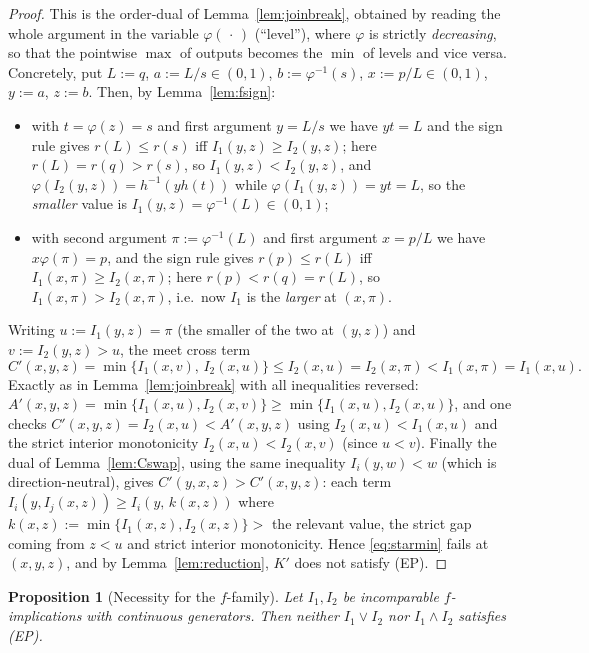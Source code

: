 \documentclass{amsart}
\theoremstyle{plain}
\newtheorem{proposition}{Proposition}
\theoremstyle{definition}
\begin{document}
\begin{proof}
This is the order-dual of Lemma~\ref{lem:joinbreak}, obtained by reading the whole argument
in the variable $\varphi(\,\cdot\,)$ (``level''), where $\varphi$ is strictly
\emph{decreasing}, so that the pointwise $\max$ of outputs becomes the $\min$ of levels and
vice versa.  Concretely, put $L:=q$, $a:=L/s\in(0,1)$, $b:=\varphi^{-1}(s)$, $x:=p/L\in
(0,1)$, $y:=a$, $z:=b$.  Then, by Lemma~\ref{lem:fsign}:
\begin{itemize}
\item with $t=\varphi(z)=s$ and first argument $y=L/s$ we have $yt=L$ and the sign rule
gives $r(L)\le r(s)$ iff $I_1(y,z)\ge I_2(y,z)$; here $r(L)=r(q)>r(s)$, so
$I_1(y,z)<I_2(y,z)$, and $\varphi(I_2(y,z))=h^{-1}(y h(t))$ while
$\varphi(I_1(y,z))=yt=L$, so the \emph{smaller} value is $I_1(y,z)=\varphi^{-1}(L)\in(0,1)$;
\item with second argument $\pi:=\varphi^{-1}(L)$ and first argument $x=p/L$ we have
$x\varphi(\pi)=p$, and the sign rule gives $r(p)\le r(L)$ iff $I_1(x,\pi)\ge I_2(x,\pi)$;
here $r(p)<r(q)=r(L)$, so $I_1(x,\pi)>I_2(x,\pi)$, i.e.\ now $I_1$ is the \emph{larger} at
$(x,\pi)$.
\end{itemize}
Writing $u:=I_1(y,z)=\pi$ (the smaller of the two at $(y,z)$) and $v:=I_2(y,z)>u$, the meet
cross term
\[
C'(x,y,z)=\min\{I_1(x,v),\,I_2(x,u)\}\le I_2(x,u)=I_2(x,\pi)<I_1(x,\pi)=I_1(x,u).
\]
Exactly as in Lemma~\ref{lem:joinbreak} with all inequalities reversed:
$A'(x,y,z)=\min\{I_1(x,u),I_2(x,v)\}\ge\min\{I_1(x,u),I_2(x,u)\}$, and one checks
$C'(x,y,z)=I_2(x,u)<A'(x,y,z)$ using $I_2(x,u)<I_1(x,u)$ and the strict interior
monotonicity $I_2(x,u)<I_2(x,v)$ (since $u<v$).  Finally the dual of
Lemma~\ref{lem:Cswap}, using the same inequality $I_i(y,w)<w$ (which is direction-neutral),
gives $C'(y,x,z)>C'(x,y,z)$: each term $I_i(y,I_j(x,z))\ge I_i(y,\,k(x,z))$ where
$k(x,z):=\min\{I_1(x,z),I_2(x,z)\}>$ the relevant value, the strict gap coming from $z<u$
and strict interior monotonicity.  Hence \eqref{eq:starmin} fails at $(x,y,z)$, and by
Lemma~\ref{lem:reduction}, $K'$ does not satisfy (EP).
\end{proof}

\begin{proposition}[Necessity for the $f$-family]\label{prop:nec-f}
Let $I_1,I_2$ be incomparable $f$-implications with continuous generators.  Then neither
$I_1\vee I_2$ nor $I_1\wedge I_2$ satisfies \textup{(EP)}.
\end{proposition}
\end{document}
